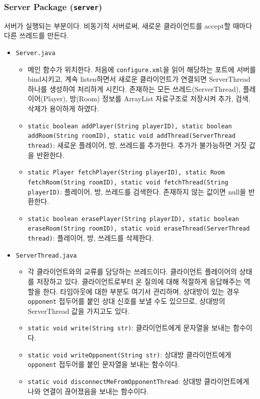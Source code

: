\documentclass[a4paper, 10pt]{article}
\begin{document}
\subsubsection{Server Package (\texttt{server})}
서버가 실행되는 부분이다. 비동기적 서버로써, 새로운 클라이언트를 accept할 때마다
다른 쓰레드를 만든다.
\begin{itemize}
  \item \texttt{Server.java}
  \begin{itemize}
    \item[] 메인 함수가 위치한다. 처음에 \texttt{configure.xml}을 읽어 해당하는 포트에
    서버를 bind시키고, 계속 listen하면서 새로운 클라이언트가 연결되면 ServerThread 하나를
    생성하여 처리하게 시킨다. 존재하는 모든 쓰레드(ServerThread), 플레이어(Player), 방(Room)
    정보를 ArrayList 자료구조로 저장시켜 추가, 검색, 삭제가 용이하게 하였다.
    \item \texttt{static boolean addPlayer(String playerID), static boolean addRoom(String roomID), static void addThread(ServerThread thread)}:
    새로운 플레이어, 방, 쓰레드를 추가한다. 추가가 불가능하면 거짓 값을 반환한다.
    \item \texttt{static Player fetchPlayer(String playerID), static Room fetchRoom(String roomID), static void fetchThread(String playerID)}:
    플레이어, 방, 쓰레드를 검색한다. 존재하지 않는 값이면 null을 반환한다.
    \item \texttt{static boolean erasePlayer(String playerID), static boolean eraseRoom(String roomID), static void eraseThread(ServerThread thread)}:
    플레이어, 방, 쓰레드를 삭제한다.
  \end{itemize}
  \item \texttt{ServerThread.java}
  \begin{itemize}
    \item[] 각 클라이언트와의 교류를 담당하는 쓰레드이다. 클라이언트 플레이어의 상태를 저장하고 있다.
    클라이언트로부터 온 질의에 대해 적절하게 응답해주는 역할을 한다. 타임아웃에 대한 부분도 여기서 관리하며,
    상대방이 있는 경우 \texttt{opponent} 접두어를 붙인 상대 신호를 보낼 수도 있으므로, 상대방의 ServerThread 값을 가지고도 있다.
    \item \texttt{static void write(String str)}: 클라이언트에게 문자열을 보내는 함수이다.
    \item \texttt{static void writeOpponent(String str)}: 상대방 클라이언트에게 \texttt{opponent} 접두어를 붙인 문자열을 보내는 함수이다.
    \item \texttt{static void disconnectMeFromOpponentThread}: 상대방 클라이언트에게 나와 연결이 끊어졌음을 보내는 함수이다.

\end{itemize}
\end{itemize}
\end{document}
